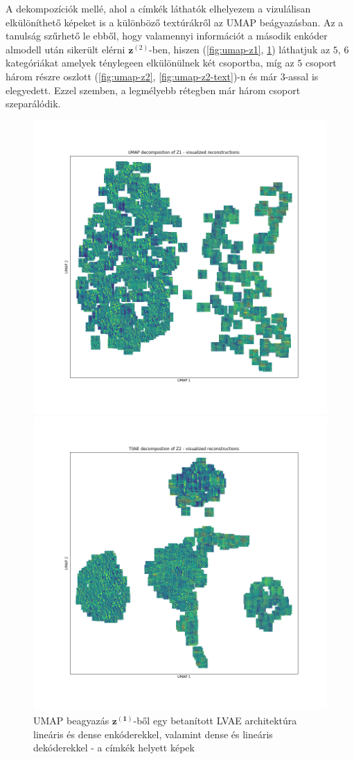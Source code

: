 \documentclass[12pt, english]{article}
\begin{document}
\vspace{4mm}

\par A dekompozíciók mellé, ahol a címkék láthatók elhelyezem a vizulálisan elkülöníthető képeket is a különböző textúrákről az UMAP beágyazásban. Az a tanulság szűrhető le ebből, hogy valamennyi információt a második enkóder almodell után sikerült elérni $\bm{z}^{(2)}$-ben, hiszen (\ref{fig:umap-z1}, \ref{fig:umap-z1-text}) láthatjuk az $5$, $6$ kategóriákat amelyek ténylegeen elkülönülnek két csoportba, míg az $5$ csoport három részre oszlott (\ref{fig:umap-z2}, \ref{fig:umap-z2-text})-n és már $3$-assal is elegyedett. Ezzel szemben, a legmélyebb rétegben már három csoport szeparálódik.

\vspace{4mm}

\begin{figure}[H] 
  \begin{minipage}{0.48\linewidth}
    \centering
    \includegraphics[width=.7\linewidth]{umap_z1_dense_lin_lin_no_norm_textures.png}
    \caption{UMAP beagyazás $\bm{z^{(1)}}$-ből egy betanított LVAE architektúra lineáris és dense enkóderekkel, valamint dense és lineáris dekóderekkel - a címkék helyett képek}
    \label{fig:umap-z1-text}
  \end{minipage}\hfill
  \begin{minipage}{0.48\linewidth}
    \centering
    \includegraphics[width=.7\linewidth]{umap_z2_dense_lin_lin_no_norm_textures.png} 

\end{minipage}
\end{figure}
\end{document}
